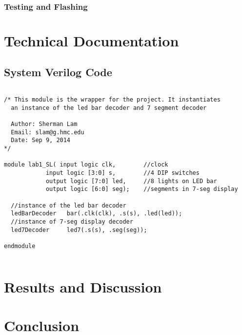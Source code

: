 \documentclass[11pt]{article}
\begin{document}
\label{sec:software_LEDbar}

\subsubsection{Testing and Flashing}



\section{Technical Documentation}



\subsection{System Verilog Code}

\small\begin{verbatim}

/* This module is the wrapper for the project. It instantiates
  an instance of the led bar decoder and 7 segment decoder
  
  Author: Sherman Lam
  Email: slam@g.hmc.edu
  Date: Sep 9, 2014
*/

module lab1_SL( input logic clk,        //clock
            input logic [3:0] s,        //4 DIP switches
            output logic [7:0] led,     //8 lights on LED bar
            output logic [6:0] seg);    //segments in 7-seg display
  
  //instance of the led bar decoder
  ledBarDecoder   bar(.clk(clk), .s(s), .led(led));   
  //instance of 7-seg display decoder
  led7Decoder     led7(.s(s), .seg(seg)); 

endmodule


\end{verbatim}




\clearpage

\section{Results and Discussion}




\section{Conclusion}
\end{document}
